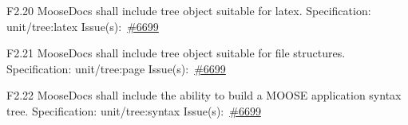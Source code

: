 \begin{Requirement}{F2.20}
MooseDocs shall include tree object suitable for latex.
\newline
Specification: unit/tree:latex
\newline
Issue(s):~\href{https://github.com/idaholab/moose/issues/6699}{\#6699}
\end{Requirement}

\begin{Requirement}{F2.21}
MooseDocs shall include tree object suitable for file structures.
\newline
Specification: unit/tree:page
\newline
Issue(s):~\href{https://github.com/idaholab/moose/issues/6699}{\#6699}
\end{Requirement}

\begin{Requirement}{F2.22}
MooseDocs shall include the ability to build a MOOSE application syntax tree.
\newline
Specification: unit/tree:syntax
\newline
Issue(s):~\href{https://github.com/idaholab/moose/issues/6699}{\#6699}
\end{Requirement}
